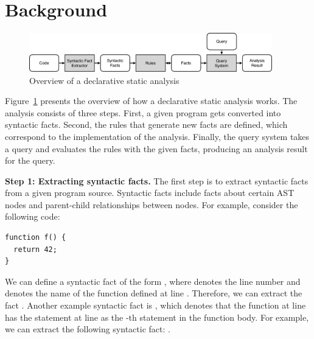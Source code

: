 \section{Background}\label{sec:background} 
\begin{figure}[t]
  \centering
  \vspace{2mm}
  \includegraphics[width=0.94\textwidth]{img/ov1.pdf}
  \caption{Overview of a declarative static analysis}
  \label{fig:ov1}
\end{figure}

Figure~\ref{fig:ov1} presents the overview of how a declarative static
analysis works.  The analysis consists of three steps.  First, a given program
gets converted into syntactic facts.  Second, the rules that generate new facts
are defined, which correspond to the implementation of the analysis.  Finally,
the query system takes a query and evaluates the rules with the
given facts, producing an analysis result for the query.


\textbf{Step 1: Extracting syntactic facts.}
The first step is to extract syntactic facts from a given program source.
Syntactic facts include facts about certain AST nodes and
parent-child relationships between nodes. For example, consider
the following code:

\begin{lstlisting}[style=mcpp]
function f() {
  return 42;
}
\end{lstlisting}
We can define a syntactic fact of the form , where
 denotes the line number and  denotes the name of the function
defined at line .  Therefore, we can extract the fact .  Another example syntactic fact is , which denotes that the function at line  has the statement
at line  as the -th statement in the function body.  For
example, we can extract the following syntactic fact: .

